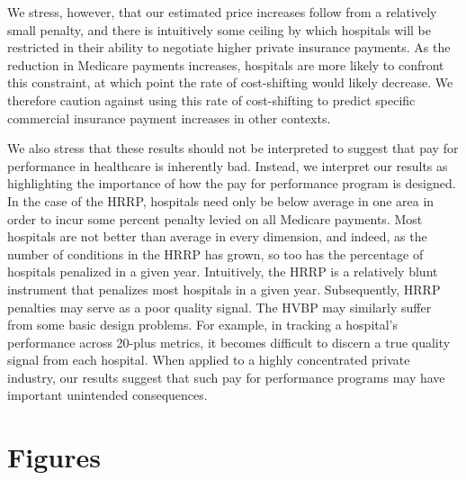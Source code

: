 \documentclass[12pt]{article}
\begin{document}
We stress, however, that our estimated price increases follow from a relatively small penalty, and there is intuitively some ceiling by which hospitals will be restricted in their ability to negotiate higher private insurance payments. As the reduction in Medicare payments increases, hospitals are more likely to confront this constraint, at which point the rate of cost-shifting would likely decrease. We therefore caution against using this rate of cost-shifting to predict specific commercial insurance payment increases in other contexts.

We also stress that these results should not be interpreted to suggest that pay for performance in healthcare is inherently bad. Instead, we interpret our results as highlighting the importance of how the pay for performance program is designed. In the case of the HRRP, hospitals need only be below average in one area in order to incur some percent penalty levied on all Medicare payments. Most hospitals are not better than average in every dimension, and indeed, as the number of conditions in the HRRP has grown, so too has the percentage of hospitals penalized in a given year. Intuitively, the HRRP is a relatively blunt instrument that penalizes most hospitals in a given year. Subsequently, HRRP penalties may serve as a poor quality signal. The HVBP may similarly suffer from some basic design problems. For example, in tracking a hospital's performance across 20-plus metrics, it becomes difficult to discern a true quality signal from each hospital. When applied to a highly concentrated private industry, our results suggest that such pay for performance programs may have important unintended consequences.

\newpage




\clearpage
\newpage


\newsavebox{\gfxbox}
\newpage
\section*{Figures}
\end{document}
